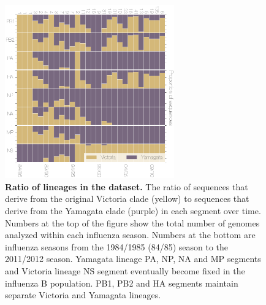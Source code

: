 \documentclass[11pt,oneside,letterpaper]{article}
\begin{document}
\begin{figure}[h]
	\centering	
	\includegraphics[width=0.65\textwidth]	{figures/InfB_LineageRatiosOverTime.png}
	\caption{\textbf{Ratio of lineages in the dataset.}
The ratio of sequences that derive from the original Victoria clade (yellow) to sequences that derive from the Yamagata clade (purple) in each segment over time.
Numbers at the top of the figure show the total number of genomes analyzed within each influenza season.
Numbers at the bottom are influenza seasons from the 1984/1985 (84/85) season to the 2011/2012 season.
Yamagata lineage PA, NP, NA and MP segments and Victoria lineage NS segment eventually become fixed in the influenza B population.
PB1, PB2 and HA segments maintain separate Victoria and Yamagata lineages.}
	\label{lineageRatiosOverTime}
\end{figure}
\end{document}
